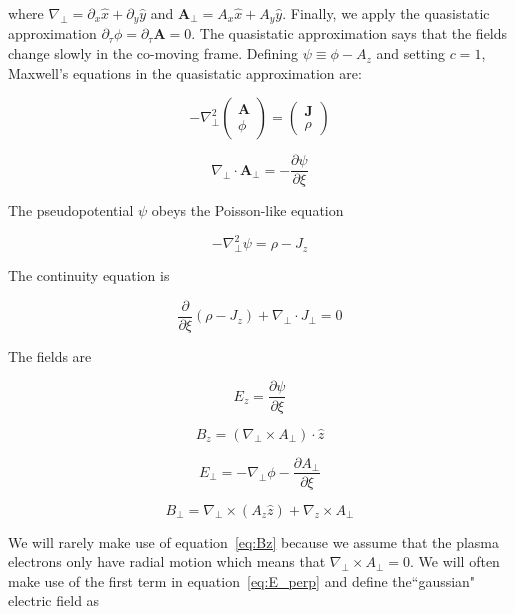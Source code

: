\documentclass[aps,prl,preprint,groupedaddress]{revtex4-1}
\newcommand{\webvector}[2]{\left( \begin{array}{c} #1 \\ #2 \end{array} \right)}
\begin{document}
where $\nabla_\perp = \partial_x \hat x + \partial_y \hat y$ and $\mathbf{A}_\perp = A_x \hat x + A_y \hat y$. Finally, we apply the quasistatic approximation $\partial_\tau \phi = \partial_\tau \mathbf{A} = 0$. The quasistatic approximation says that the fields change slowly in the co-moving frame. Defining $\psi \equiv \phi - A_z$ and setting $c = 1$, Maxwell's equations in the quasistatic approximation are:

\begin{equation}\label{eq:max_qs}
-\nabla^2_\perp \webvector{\mathbf{A}}{\phi} = \webvector{\mathbf{J}}{\rho}
\end{equation}

\begin{equation}\label{eq:gauge_qs}
\nabla_\perp \cdot \mathbf{A}_\perp = -\frac{\partial \psi}{\partial \xi}
\end{equation}

The pseudopotential $\psi$ obeys the Poisson-like equation

\begin{equation}\label{eq:Poisson}
-\nabla^2_\perp \psi = \rho - J_z
\end{equation}

The continuity equation is

\begin{equation}\label{eq:Cont}
\frac{\partial}{\partial \xi} (\rho - J_z) + \nabla_\perp \cdot J_\perp = 0
\end{equation}

The fields are 

\begin{equation}\label{eq:Ez}
E_z = \frac{\partial \psi}{\partial \xi}
\end{equation} 

\begin{equation}\label{eq:Bz}
B_z = (\nabla_\perp \times A_\perp)\cdot \hat{z}
\end{equation} 

\begin{equation}\label{eq:E_perp}
E_\perp = -\nabla_\perp \phi - \frac{\partial A_\perp}{\partial \xi}
\end{equation}

\begin{equation}\label{eq:B_perp}
B_\perp = \nabla_\perp \times (A_z \hat{z}) + \nabla_z \times A_\perp
\end{equation}

We will rarely make use of equation~\ref{eq:Bz} because we assume that the plasma electrons only have radial motion which means that $\nabla_\perp \times A_\perp = 0$. We will often make use of the first term in equation~\ref{eq:E_perp} and define the``gaussian" electric field as
\end{document}
